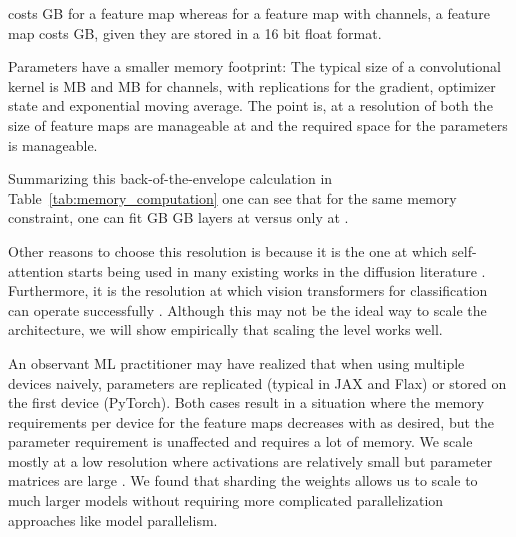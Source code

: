 \documentclass[nohyperref]{article}
\theoremstyle{plain}
\theoremstyle{definition}
\theoremstyle{remark}
\begin{document}
costs  GB for a feature map whereas for a  feature map with  channels, a feature map costs  GB, given they are stored in a 16 bit float format. 

Parameters have a smaller memory footprint: The typical size of a convolutional kernel is MB and MB for  channels, with  replications for the gradient, optimizer state and exponential moving average. The point is, at a resolution of  both the size of feature maps are manageable at  and the required space for the parameters is manageable.


\begin{table}
    \centering
    \caption{Memory and compute for a convolutional layer at the typical sizes encountered in diffusion architectures. Using more channels is usually much cheaper at lower resolutions in terms of memory,  for this example.}
    \label{tab:memory_computation}
\end{table}

Summarizing this back-of-the-envelope calculation in Table~\ref{tab:memory_computation} one can see that for the same memory constraint, one can fit GB  GB  layers at  versus only  at .


Other reasons to choose this resolution is because it is the one at which self-attention starts being used in many existing works in the diffusion literature \citep{ho2020denoising,nichol2021improvedddpm}. Furthermore, it is the  resolution at which vision transformers for classification can operate successfully \citep{dosovitskiy2021imageisworth}. Although this may not be the ideal way to scale the architecture, we will show empirically that scaling the  level works well.

An observant ML practitioner may have realized that when using multiple devices naively, parameters are replicated (typical in JAX and Flax) or stored on the first device (PyTorch). Both cases result in a situation where the memory requirements per device for the feature maps decreases with  as desired, but the parameter requirement is unaffected and requires a lot of memory. We scale mostly at a low resolution where activations are relatively small but parameter matrices are large . We found that sharding the weights allows us to scale to much larger models without requiring more complicated parallelization approaches like model parallelism.
\end{document}

